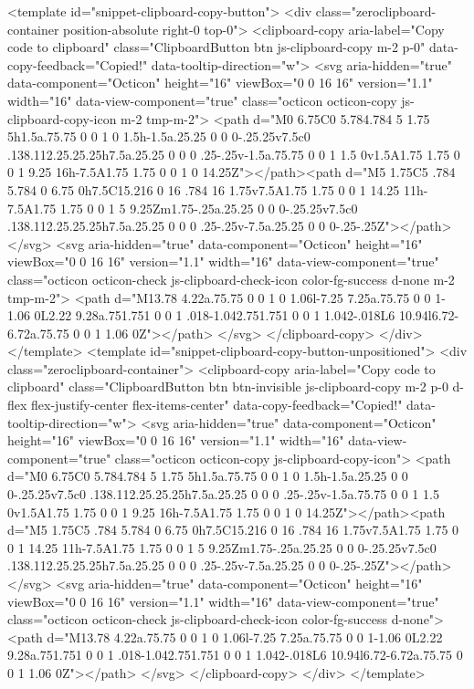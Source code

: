 {{{{{    <template id="snippet-clipboard-copy-button">
  <div class="zeroclipboard-container position-absolute right-0 top-0">
    <clipboard-copy aria-label="Copy code to clipboard" class="ClipboardButton btn js-clipboard-copy m-2 p-0" data-copy-feedback="Copied!" data-tooltip-direction="w">
      <svg aria-hidden="true" data-component="Octicon" height="16" viewBox="0 0 16 16" version="1.1" width="16" data-view-component="true" class="octicon octicon-copy js-clipboard-copy-icon m-2 tmp-m-2">
    <path d="M0 6.75C0 5.784.784 5 1.75 5h1.5a.75.75 0 0 1 0 1.5h-1.5a.25.25 0 0 0-.25.25v7.5c0 .138.112.25.25.25h7.5a.25.25 0 0 0 .25-.25v-1.5a.75.75 0 0 1 1.5 0v1.5A1.75 1.75 0 0 1 9.25 16h-7.5A1.75 1.75 0 0 1 0 14.25Z"></path><path d="M5 1.75C5 .784 5.784 0 6.75 0h7.5C15.216 0 16 .784 16 1.75v7.5A1.75 1.75 0 0 1 14.25 11h-7.5A1.75 1.75 0 0 1 5 9.25Zm1.75-.25a.25.25 0 0 0-.25.25v7.5c0 .138.112.25.25.25h7.5a.25.25 0 0 0 .25-.25v-7.5a.25.25 0 0 0-.25-.25Z"></path>
</svg>
      <svg aria-hidden="true" data-component="Octicon" height="16" viewBox="0 0 16 16" version="1.1" width="16" data-view-component="true" class="octicon octicon-check js-clipboard-check-icon color-fg-success d-none m-2 tmp-m-2">
    <path d="M13.78 4.22a.75.75 0 0 1 0 1.06l-7.25 7.25a.75.75 0 0 1-1.06 0L2.22 9.28a.751.751 0 0 1 .018-1.042.751.751 0 0 1 1.042-.018L6 10.94l6.72-6.72a.75.75 0 0 1 1.06 0Z"></path>
</svg>
    </clipboard-copy>
  </div>
</template>
<template id="snippet-clipboard-copy-button-unpositioned">
  <div class="zeroclipboard-container">
    <clipboard-copy aria-label="Copy code to clipboard" class="ClipboardButton btn btn-invisible js-clipboard-copy m-2 p-0 d-flex flex-justify-center flex-items-center" data-copy-feedback="Copied!" data-tooltip-direction="w">
      <svg aria-hidden="true" data-component="Octicon" height="16" viewBox="0 0 16 16" version="1.1" width="16" data-view-component="true" class="octicon octicon-copy js-clipboard-copy-icon">
    <path d="M0 6.75C0 5.784.784 5 1.75 5h1.5a.75.75 0 0 1 0 1.5h-1.5a.25.25 0 0 0-.25.25v7.5c0 .138.112.25.25.25h7.5a.25.25 0 0 0 .25-.25v-1.5a.75.75 0 0 1 1.5 0v1.5A1.75 1.75 0 0 1 9.25 16h-7.5A1.75 1.75 0 0 1 0 14.25Z"></path><path d="M5 1.75C5 .784 5.784 0 6.75 0h7.5C15.216 0 16 .784 16 1.75v7.5A1.75 1.75 0 0 1 14.25 11h-7.5A1.75 1.75 0 0 1 5 9.25Zm1.75-.25a.25.25 0 0 0-.25.25v7.5c0 .138.112.25.25.25h7.5a.25.25 0 0 0 .25-.25v-7.5a.25.25 0 0 0-.25-.25Z"></path>
</svg>
      <svg aria-hidden="true" data-component="Octicon" height="16" viewBox="0 0 16 16" version="1.1" width="16" data-view-component="true" class="octicon octicon-check js-clipboard-check-icon color-fg-success d-none">
    <path d="M13.78 4.22a.75.75 0 0 1 0 1.06l-7.25 7.25a.75.75 0 0 1-1.06 0L2.22 9.28a.751.751 0 0 1 .018-1.042.751.751 0 0 1 1.042-.018L6 10.94l6.72-6.72a.75.75 0 0 1 1.06 0Z"></path>
</svg>
    </clipboard-copy>
  </div>
</template>


}}}}}
